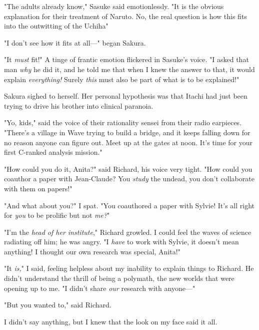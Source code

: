 "The adults already know," Sasuke said emotionlessly. "It is the obvious
explanation for their treatment of Naruto. No, the real question is how this
fits into the outwitting of the Uchiha{\el}"

"I don't see how it fits at all\mbox{---}" began Sakura.

"It \emph{must} fit!" A tinge of frantic emotion flickered in Sasuke's voice.
"I asked that man \emph{why} he did it, and he told me that when I knew the
answer to that, it would explain \emph{everything!} Surely \emph{this} must
also be part of what is to be explained!"

Sakura sighed to herself. Her personal hypothesis was that Itachi had just been
trying to drive his brother into clinical paranoia.

"Yo, kids," said the voice of their rationality sensei from their radio
earpieces. "There's a village in Wave trying to build a bridge, and it keeps
falling down for no reason anyone can figure out. Meet up at the gates at noon.
It's time for your first C-ranked analysis mission."
%
\sbreak

\noindent{}"How could you do it, Anita?" said Richard, his voice very tight. "How could
you coauthor a paper with Jean-Claude? You \emph{study} the undead, you don't
collaborate with them on papers!"

"And what about you?" I spat. "You coauthored a paper with Sylvie! It's all
right for \emph{you} to be prolific but not \emph{me?}"

"I'm the \emph{head of her institute}," Richard growled. I could feel the waves
of science radiating off him; he was angry. "I \emph{have} to work with Sylvie,
it doesn't mean anything! I thought our own research was special, Anita!"

"It \emph{is,}" I said, feeling helpless about my inability to explain things
to Richard. He didn't understand the thrill of being a polymath, the new worlds
that were opening up to me. "I didn't share \emph{our} research with anyone\mbox{---}"

"But you wanted to," said Richard.

I didn't say anything, but I knew that the look on my face said it all.

